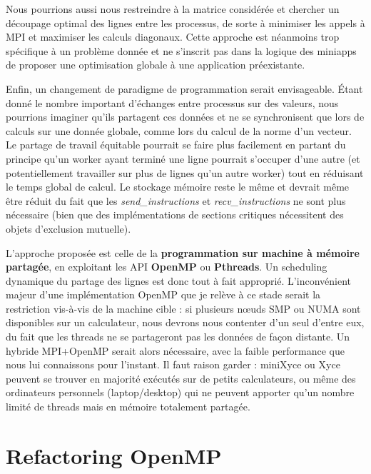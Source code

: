 \documentclass[11pt,a4paper,oneside]{memoir}
\theoremstyle{definition}
\theoremstyle{remark}
\theoremstyle{plain}
\begin{document}
Nous pourrions aussi nous restreindre à la matrice considérée et chercher un découpage optimal des lignes entre les processus, de sorte à minimiser les appels à MPI et maximiser les calculs diagonaux. Cette approche est néanmoins trop spécifique à un problème donnée et ne s'inscrit pas dans la logique des miniapps de proposer une optimisation globale à une application préexistante.\medskip

Enfin, un changement de paradigme de programmation serait envisageable. \'Etant donné le nombre important d'échanges entre processus sur des valeurs, nous pourrions imaginer qu'ils partagent ces données et ne se synchronisent que lors de calculs sur une donnée globale, comme lors du calcul de la norme d'un vecteur. Le partage de travail équitable pourrait se faire plus facilement en partant du principe qu'un worker ayant terminé une ligne pourrait s'occuper d'une autre (et potentiellement travailler sur plus de lignes qu'un autre worker) tout en réduisant le temps global de calcul. Le stockage mémoire reste le même et devrait même être réduit du fait que les \textit{send\_instructions} et \textit{recv\_instructions} ne sont plus nécessaire (bien que des implémentations de sections critiques nécessitent des objets d'exclusion mutuelle).

L'approche proposée est celle de la \textbf{programmation sur machine à mémoire partagée}, en exploitant les API \textbf{OpenMP} ou \textbf{Pthreads}. Un scheduling dynamique du partage des lignes est donc tout à fait approprié. L'inconvénient majeur d'une implémentation OpenMP que je relève à ce stade serait la restriction vis-à-vis de la machine cible : si plusieurs nœuds SMP ou NUMA sont disponibles sur un calculateur, nous devrons nous contenter d'un seul d'entre eux, du fait que les threads ne se partageront pas les données de façon distante. Un hybride MPI+OpenMP serait alors nécessaire, avec la faible performance que nous lui connaissons pour l'instant. Il faut raison garder : miniXyce ou Xyce peuvent se trouver en majorité exécutés sur de petits calculateurs, ou même des ordinateurs personnels (laptop/desktop) qui ne peuvent apporter qu'un nombre limité de threads mais en mémoire totalement partagée.






\chapter{Refactoring OpenMP}
\end{document}
